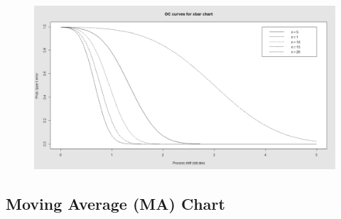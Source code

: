 \documentclass[]{article}
\begin{document}
\begin{figure}
\centering
\includegraphics[width=0.7\linewidth]{./OCpistonrings}
\caption{}
\label{fig:OCpistonrings}
\end{figure}

\newpage
\subsection{Moving Average (MA) Chart}
\end{document}

